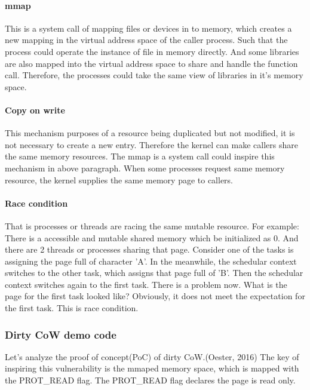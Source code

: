 \documentclass[12pt,a4paper]{IEEEconf}
\begin{document}
\paragraph{mmap}
This is a system call of mapping files or devices in to memory, which creates a
new mapping in the virtual address space of the caller process. Such that
the process could operate the instance of file in memory directly.
And some libraries are also mapped into the virtual address space to share and handle
the function call. Therefore, the processes could take the same view of libraries in
it's memory space.

\paragraph{Copy on write}
This mechanism purposes of a resource being duplicated but not modified, it is not
necessary to create a new entry. Therefore the kernel can make callers share
the same memory resources. The mmap is a system call could inspire this mechanism
in above paragraph. When some processes request same memory resource, the kernel
supplies the same memory page to callers.

\paragraph{Race condition}
That is processes or threads are racing the same mutable resource. For example:
There is a accessible and mutable shared memory which be initialized as 0. And there
are 2 threads or processes sharing that page. Consider one of the tasks is assigning
the page full of character 'A'. In the meanwhile, the schedular context switches to
the other task, which assigns that page full of 'B'. Then the schedular context switches
again to the first task. There is a problem now. What is the page for the first
task looked like? Obviously, it does not meet the expectation for the first task.
This is race condition.

\subsubsection{Dirty CoW demo code}
Let's analyze the proof of concept(PoC) of dirty CoW.(Oester, 2016)\cite{Dirty_CoW}
The key of inspiring this vulnerability is the mmaped memory space, which is mapped with
the PROT\_READ flag. The PROT\_READ flag declares the page is read only.

\end{document}
